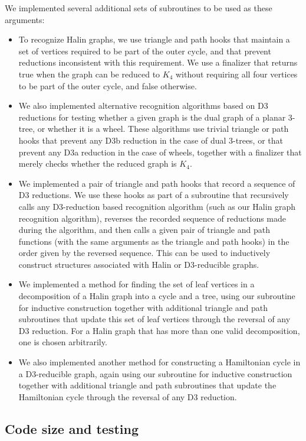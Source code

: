 \documentclass{article}
\begin{document}
\noindent
We  implemented several additional sets of subroutines to be used as these arguments:
\begin{itemize}
\item To recognize Halin graphs, we use triangle and path hooks that maintain a set of vertices required to be part of the outer cycle, and that prevent reductions inconsistent with this requirement.
We use a finalizer that returns true when the graph can be reduced to $K_4$ without requiring all four vertices to be part of the outer cycle, and false otherwise.
\item We also implemented alternative recognition algorithms based on D3 reductions for testing whether a given graph is the dual graph of a planar 3-tree, or whether it is a wheel. These algorithms use trivial triangle or path hooks that prevent any D3b reduction in the case of dual 3-trees, or that prevent any D3a reduction in the case of wheels, together with a finalizer that merely checks whether the reduced graph is $K_4$.
\item We implemented a pair of triangle and path hooks that record a sequence of D3 reductions. We use these hooks as part of a subroutine that recursively calls any D3-reduction based recognition algorithm (such as our Halin graph recognition algorithm), reverses the recorded sequence of reductions made during the algorithm, and then calls a given pair of triangle and path functions (with the same arguments as the triangle and path hooks) in the order given by the reversed sequence. This can be used to inductively construct structures associated with Halin or D3-reducible graphs.
\item We implemented a method for finding the set of leaf vertices in a decomposition of a Halin graph into a cycle and a tree, using our subroutine for inductive construction together with additional triangle and path subroutines that update this set of leaf vertices through the reversal of any D3 reduction. For a Halin graph that has more than one valid decomposition, one is chosen arbitrarily.
\item We also implemented another method for constructing a Hamiltonian cycle in a D3-reducible graph, again using our subroutine for inductive construction together with additional triangle and path subroutines that update the Hamiltonian cycle through the reversal of any D3 reduction.
\end{itemize}

\subsection{Code size and testing}
\end{document}
